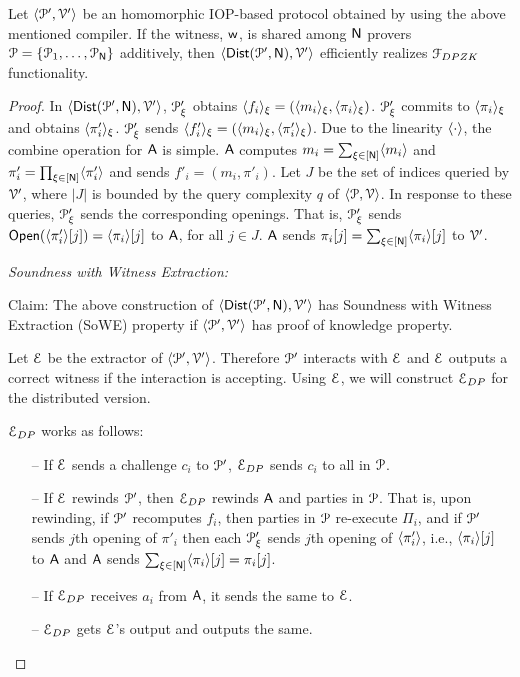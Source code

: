 \begin{lemma}\label{lemma:generic_dpzk}
	Let $\langle \mathcal{P}',\mathcal{V}'\rangle$ be an homomorphic IOP-based protocol obtained by using the above mentioned compiler. If the witness, $\mathsf{w}$, is shared among $\mathsf{N}$ provers $\mathcal{P} = \{\mathcal{P}_1, \ldots, \mathcal{P}_{\mathsf{N}}\}$ additively, then $\langle \mathsf{Dist}(\mathcal{P}', \mathsf{N}),\mathcal{V}'\rangle$ efficiently realizes $\mathcal{F}_{DPZK}$ functionality.
\end{lemma}
	
\begin{proof}
	In $\langle \mathsf{Dist}(\mathcal{P}', \mathsf{N}),\mathcal{V}'\rangle$, $\mathcal{P}_\xi'$ obtains $\langle f_i \rangle_{\xi} = (\langle m_i \rangle_{\xi}, \langle \pi_i \rangle_{\xi})$. $\mathcal{P}_\xi'$ commits to $\langle \pi_i \rangle_{\xi}$ and obtains $\langle \pi'_i \rangle_{\xi}$. $\mathcal{P}_\xi'$ sends $\langle f'_i \rangle_{\xi} = (\langle m_i \rangle_{\xi}, \langle \pi'_i \rangle_{\xi})$. Due to the linearity $\langle \cdot \rangle$, the combine operation for $\mathsf{A}$ is simple. $\mathsf{A}$ computes $m_i = \sum_{\xi\in [\mathsf{N}]} \langle m_i \rangle$ and $\pi'_i = \prod_{\xi \in [\mathsf{N}]} \langle \pi'_i \rangle$ and sends $f'_i = (m_i,\pi'_i)$.
	Let $J$ be the set of indices queried by $\mathcal{V}'$, where $|J|$ is bounded by the query complexity $q$ of $\langle \mathcal{P},\mathcal{V}\rangle$. In response to these queries, $\mathcal{P}_\xi'$ sends the corresponding openings. That is, $\mathcal{P}_\xi'$ sends $\mathsf{Open}(\langle \pi'_i \rangle[j]) = \langle \pi_i \rangle[j]$ to $\mathsf{A}$, for all $j \in J$. $\mathsf{A}$ sends $\pi_i[j] = \sum_{\xi\in [\mathsf{N}]} \langle \pi_i \rangle[j]$ to $\mathcal{V}'$.
	
	\textit{Soundness with Witness Extraction:}
	
	Claim: The above construction of $\langle \mathsf{Dist}(\mathcal{P}', \mathsf{N}),\mathcal{V}'\rangle$ has Soundness with Witness Extraction (SoWE) property if $\langle \mathcal{P}',\mathcal{V}'\rangle$ has proof of knowledge property. 
	
	Let $\mathcal{E}$ be the extractor of $\langle \mathcal{P}',\mathcal{V}'\rangle$. Therefore $\mathcal{P}'$ interacts with $\mathcal{E}$ and $\mathcal{E}$ outputs a correct witness if the interaction is accepting. Using $\mathcal{E}$, we will construct $\mathcal{E}_{DP}$ for the distributed version.
	
	$\mathcal{E}_{DP}$ works as follows:
	\begin{itemize}
		\item[--] If $\mathcal{E}$ sends a challenge $c_i$ to $\mathcal{P}'$, $\mathcal{E}_{DP}$ sends $c_i$ to all in $\mathcal{P}$.
		\item[--] If $\mathcal{E}$ rewinds $\mathcal{P}'$, then $\mathcal{E}_{DP}$ rewinds $\mathsf{A}$ and parties in $\mathcal{P}$. That is, upon rewinding, if $\mathcal{P}'$ recomputes $f_i$, then parties in $\mathcal{P}$ re-execute $\Pi_i$, and if $\mathcal{P}'$ sends $j$th opening of $\pi'_i$ then each $\mathcal{P}_\xi'$ sends $j$th opening of $\langle \pi'_i \rangle$, i.e., $\langle \pi_i \rangle[j]$ to $\mathsf{A}$ and $\mathsf{A}$ sends $\sum_{\xi\in [\mathsf{N}]} \langle \pi_i \rangle[j] = \pi_i[j]$.
		\item[--] If $\mathcal{E}_{DP}$ receives $a_i$ from $\mathsf{A}$, it sends the same to $\mathcal{E}$.
		\item[--] $\mathcal{E}_{DP}$ gets $\mathcal{E}$'s output and outputs the same.
	\end{itemize}
	

\end{proof}
